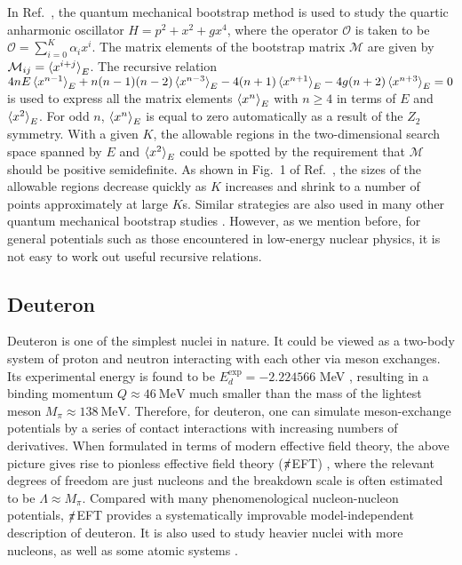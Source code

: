 \documentclass[aps,prc,reprint,superscriptaddress,nofootinbib]{revtex4-2}
\begin{document}
In Ref.~\cite{Han:2020bkb}, the quantum mechanical bootstrap method is used to study the quartic anharmonic oscillator
$H=p^2+x^2+gx^4$,
where
the operator $\mathcal{O}$ is taken to be
$\mathcal{O}=\sum_{i=0}^K\alpha_i x^i$.
The matrix elements of the bootstrap matrix $\bm{\mathcal{M}}$ are given by $\mathcal{M}_{ij}=\braket{x^{i+j}}_E$.
The recursive relation 
$4nE\braket{x^{n-1}}_E+n(n-1)(n-2)\braket{x^{n-3}}_E-4(n+1)\braket{x^{n+1}}_E-4g(n+2)\braket{x^{n+3}}_E=0$
is used to express all the matrix elements $\braket{x^n}_E$ with $n\geq4$ in terms of $E$
and $\braket{x^2}_E$.  
For odd $n$, $\braket{x^n}_E$ is equal to zero automatically as a result of the $Z_2$ symmetry.
With a given $K$, 
the allowable regions in the two-dimensional search space spanned by $E$ and $\braket{x^2}_E$ could be spotted
by the requirement that $\bm{\mathcal{M}}$ should be positive semidefinite.
As shown in Fig.~1 of Ref.~\cite{Han:2020bkb},
the sizes of the allowable regions decrease quickly as $K$ increases and shrink to a number of points approximately at large $K$s.
%
Similar strategies are also used in many other quantum mechanical bootstrap studies \cite{Berenstein:2021dyf,Bhattacharya:2021btd,Aikawa:2021eai,Tchoumakov:2021mnh,Aikawa:2021qbl,Berenstein:2021loy,Du:2021hfw}.
However, as we mention before, for general potentials such as those encountered in low-energy nuclear physics, it is not easy to work out useful recursive relations.

\subsection{Deuteron}

Deuteron is one of the simplest nuclei in nature. It could be viewed
as a two-body system of proton and neutron interacting with each other via meson exchanges. 
Its experimental energy is found to be $E_d^\text{exp}=-2.224566$ MeV \cite{Wang:2012},
resulting in a binding momentum $Q\approx46\ \text{MeV}$ much smaller than the mass of the lightest meson $M_\pi\approx138\ \text{MeV}$.
Therefore, for deuteron, one can simulate meson-exchange potentials by a series of contact interactions
with increasing numbers of derivatives.
When formulated in terms of modern effective field theory,
the above picture gives rise to pionless effective field theory ($\slashed{\pi}$EFT) \cite{Bedaque:2002mn,Hammer:2019poc},
where the relevant degrees of freedom are just nucleons and the breakdown scale is often estimated to be $\Lambda\approx M_\pi$.
Compared with many phenomenological nucleon-nucleon potentials, $\slashed{\pi}$EFT provides a systematically improvable model-independent
description of deuteron.
It is also used to study heavier nuclei with more nucleons, as well as some atomic systems \cite{Kirscher:2015ana,Bazak:2018qnu}.
\end{document}
